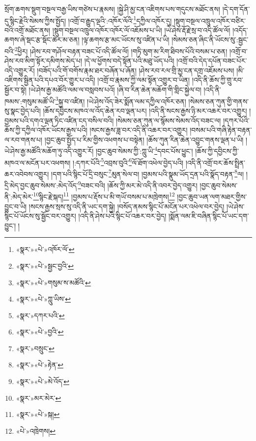 སྲོག་ཆགས་སྡུག་བསྔལ་བརྒྱ་ཡིས་གཙེས་པ་རྣམས། །སྐྱེ་ཤི་མྱ་ངན་འཇིགས་པས་གདུངས་མཐོང་ནས། །དེ་དག་དོན་དུ་སྙིང་རྗེའི་སེམས་ཀྱིས་སྤྱོད། །འགྲོ་བ་རྒྱུད་ལྔའི་:འཁོར་ལོའི་\footnote{«སྣར་»«པེ་»འཁོར་ལོ་}དཀྱིལ་འཁོར་དུ། །སྡུག་བསྔལ་འཁྲུལ་འཁོར་བཙིར་བའི་འགྲོ་མཐོང་ནས། །སྡུག་བསྔལ་འཁྲུལ་འཁོར་འཁོར་ལོ་འཇོམས་པ་ཡི། །ཡེ་ཤེས་རྡོ་རྗེ་སྲ་བ་འདི་ཚོལ་ལོ། །འདོད་ཆགས་ཞེ་སྡང་རྩ་སྡོང་ཚེར་མ་ཅན། །ལྟ་ཆགས་རྩ་མང་ཡོངས་སུ་འཛིན་པ་ཡི། །སེམས་ཅན་ཞིང་ནི་ཡོངས་སུ་:སྦྱང་བའི་\footnote{«སྣར་»«པེ་»སྦྱང་བྱའི་}ཕྱིར། །ཤེས་རབ་གཤོལ་བརྟན་བཟང་པོ་འདི་ཚོལ་ལོ། །གཏི་མུག་མ་རིག་ཐིབས་པོའི་བསམ་པ་ཅན། །འགྲོ་བ་ཤེས་རབ་མིག་སྟོར་དམིགས་མེད་པ། །དེ་ལ་ཕྱོགས་བདེ་སྟོན་པའི་མཐུ་ཡོད་པའི། །འགྲོ་བའི་དེད་དཔོན་བཟང་པོར་འདི་འགྱུར་རོ། །བཟོད་པའི་གོ་བགོས་རྣམ་ཐར་བཞོན་པ་ཞོན། །ཤེས་རབ་རལ་གྲི་མྱ་ངན་དགྲ་འཇོམས་པས། །མི་འཇིགས་སྦྱིན་པའི་དཔའ་བོར་གྱུར་པ་འདི། །འགྲོ་བ་རྣམས་ཀྱི་ལམ་སྟོན་འགྱུར་བ་ཡིན། །འདི་ནི་ཆོས་ཀྱི་གྲུ་རབ་སྦྱོར་བ་སྟེ། །ཡེ་ཤེས་རྒྱ་མཚོའི་ལམ་ལ་བསླབས་པའོ། །ཞི་བ་རིན་ཆེན་མཆོག་གི་གླིང་སྐྱེལ་བ། །འདི་ནི་ཁམས་:གསུམ་མཚོ་ཡི་\footnote{«སྣར་»«པེ་»གསུམ་ས་མཚོའི་}སྐྱ་བ་འཛིན། །ཡེ་ཤེས་འོད་ཟེར་སྨོན་ལམ་དཀྱིལ་འཁོར་ཅན། །སེམས་ཅན་ཀུན་གྱི་གནས་སུ་སྣང་བྱེད་པའི། །ཆོས་དབྱིངས་མཁའ་ལ་འོད་ཆེན་རབ་ལྡན་པར། །འདི་ནི་སངས་རྒྱས་ཉི་མར་འཆར་བར་འགྱུར། །བྱམས་པའི་དགའ་ལྡན་ཏིང་འཛིན་ངད་བསིལ་བའི། །སེམས་ཅན་ཀུན་ལ་སྙོམས་སེམས་འོད་བཟང་ལ། །དཀར་པོའི་ཆོས་ཀྱི་དཀྱིལ་འཁོར་ཡོངས་རྒྱས་པའི། །སངས་རྒྱས་ཟླ་བར་འདི་ནི་འཆར་བར་འགྱུར། །བསམ་པའི་གཞི་རྟེན་བརྟན་ལ་རབ་གནས་པ། །བྱང་ཆུབ་སྤྱོད་པ་རིམ་གྱིས་འཕགས་པ་བསྟེན། །ཆོས་ཀུན་རིན་ཆེན་འབྱུང་གནས་ལྡན་པ་ཡི། །ཡེ་ཤེས་རྒྱ་མཚོའི་མཆོག་ཏུ་འདི་འགྱུར་རོ། །བྱང་ཆུབ་སེམས་ཀྱི་:ཀླུ་ཡི་\footnote{«སྣར་»«པེ་»ཀླུ་ཡིས་}དབང་པོས་ཕྱུང་། །ཆོས་ཀྱི་དབྱིངས་ཀྱི་མཁའ་ལ་མངོན་པར་འཕགས། །:དཀར་པོའི་\footnote{«སྣར་»དཀར་པའི་}འབྲས་བུའི་\footnote{«སྣར་»«པེ་»བྱའི་}ལོ་ཐོག་འཕེལ་བྱེད་པའི། །འདི་ནི་འགྲོ་བར་ཆོས་སྤྲིན་ཆར་འབེབས་འགྱུར། །དག་པའི་སྙིང་པོ་དྲི་བསུང་\footnote{«སྣར་»བསྲུང་}མུན་སེལ་བ། །བྱམས་པའི་སྣུམ་ཡོད་དྲན་པའི་སྣོད་བརྟན་\footnote{«སྣར་»«པེ་»རྟེན་}ལ། །དྲི་མེད་བྱང་ཆུབ་སེམས་:མེད་འོད་\footnote{«སྣར་»«པེ་»མེ་འོད་}བཟང་བའི། །ཆོས་ཀྱི་མར་མེ་འདི་ནི་འབར་བྱེད་འགྱུར། །བྱང་ཆུབ་སེམས་ནི་:མེད་མེར་\footnote{«སྣར་»མར་མེར་}སྙིང་རྗེ་སྐད།\footnote{«སྣར་»«པེ་»སྐ།} །བྱམས་པ་རྡོས་པ་མི་གཡོ་བསམ་པ་མཁྲེགས།\footnote{«པེ་»འཁྲེགས།} །བྱང་ཆུབ་ཡན་ལག་མཐར་གྱིས་བྱུང་བ་ཡི། །སངས་རྒྱས་སྲས་སུ་འདི་ནི་ཡང་དག་སྐྱེ། །བསོད་ནམས་སྙིང་པོ་མངོན་པར་འཕེལ་བར་བྱེད། །ཡེ་ཤེས་སྙིང་པོ་ཡོངས་སུ་སྦྱོང་བར་འགྱུར། །འདི་ནི་ཤེས་པའི་སྙིང་པོ་འཆར་བར་བྱེད། །སྨོན་ལམ་ཇི་བཞིན་སྙིང་པོ་ཡང་དག་བྱུང་། །
